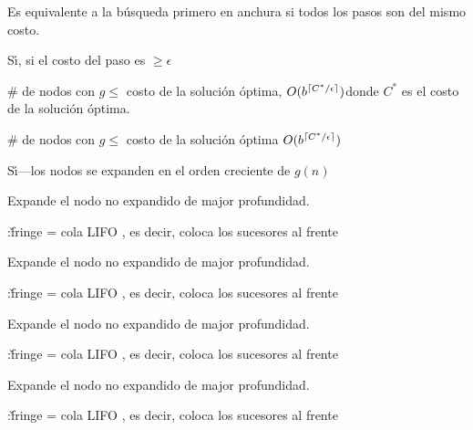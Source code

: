 \documentclass{article}
\begin{document}
\begin{huge}
Es equivalente a la b{\'u}squeda primero en anchura si todos los
pasos son del mismo costo.

 S{\'\i}, si el costo del paso es $\geq \epsilon$

 \# de nodos con $g \leq {}$ costo de la soluci{\'o}n
{\'o}ptima, $O(b^{\lceil C^*/\epsilon \rceil})$\al donde $C^*$ es el
costo de la soluci{\'o}n {\'o}ptima.

 \# de nodos con $g \leq {}$ costo de la soluci{\'o}n
{\'o}ptima $O(b^{\lceil C^*/\epsilon \rceil})$

 S{\'\i}---los nodos se expanden en el orden
creciente de $g(n)$



Expande el nodo no expandido de major profundidad.

:\nl \v{fringe} = cola LIFO , es decir,
coloca los sucesores al frente

\textwidth
{}



Expande el nodo no expandido de major profundidad.

:\nl \v{fringe} = cola LIFO , es decir,
coloca los sucesores al frente

\textwidth
{}



Expande el nodo no expandido de major profundidad.

:\nl \v{fringe} = cola LIFO , es decir,
coloca los sucesores al frente

\textwidth
{}



Expande el nodo no expandido de major profundidad.

:\nl \v{fringe} = cola LIFO , es decir,
coloca los sucesores al frente

\textwidth
{}



\end{huge}
\end{document}
